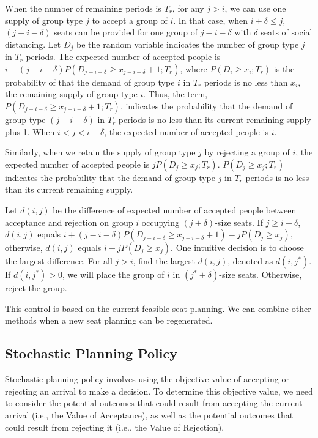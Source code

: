 When the number of remaining periods is $T_r$, for any $j>i$, we can use one supply of group type $j$ to accept a group of $i$. In that case, when $i+\delta \leq j$, $(j-i-\delta)$ seats can be provided for one group of $j-i-\delta$ with $\delta$ seats of social distancing. Let $D_j$ be the random variable indicates the number of group type $j$ in $T_r$ periods. The expected number of accepted people is $i + (j-i-\delta)P(D_{j-i-\delta} \geq x_{j-i-\delta}+1; T_r)$, where $P(D_i \geq x_i; T_r)$ is the probability of that the demand of group type $i$ in $T_r$ periods is no less than $x_i$, the remaining supply of group type $i$. Thus, the term, $P(D_{j-i-\delta} \geq x_{j-i-\delta}+1; T_r)$, indicates the probability that the demand of group type $(j-i-\delta)$ in $T_r$ periods is no less than its current remaining supply plus 1. When $i <j < i+\delta$, the expected number of accepted people is $i$.

Similarly, when we retain the supply of group type $j$ by rejecting a group of $i$, the expected number of accepted people is $j P(D_{j} \geq x_{j}; T_r)$. $P(D_{j} \geq x_{j}; T_r)$ indicates the probability that the demand of group type $j$ in $T_r$ periods is no less than its current remaining supply.

Let $d(i,j)$ be the difference of expected number of accepted people between acceptance and rejection on group $i$ occupying $(j+\delta)$-size seats. If $j \geq i+\delta$, $d(i,j)$ equals $i + (j-i-\delta)P(D_{j-i-\delta} \geq x_{j-i-\delta}+1) - j P(D_{j} \geq x_{j})$, otherwise, $d(i,j)$ equals $i - j P(D_{j} \geq x_{j})$. One intuitive decision is to choose the largest difference. For all $j >i$, find the largest $d(i,j)$, denoted as $d(i,j^{*})$. If $d(i,j^{*}) >0$, we will place the group of $i$ in $(j^{*}+\delta)$-size seats. Otherwise, reject the group.


\begin{remark}
  This control is based on the current feasible seat planning. We can combine other methods when a new seat planning can be regenerated.
\end{remark}

\subsection{Stochastic Planning Policy}
Stochastic planning policy involves using the objective value of accepting or rejecting an arrival to make a decision. To determine this objective value, we need to consider the potential outcomes that could result from accepting the current arrival (i.e., the Value of Acceptance), as well as the potential outcomes that could result from rejecting it (i.e., the Value of Rejection).

